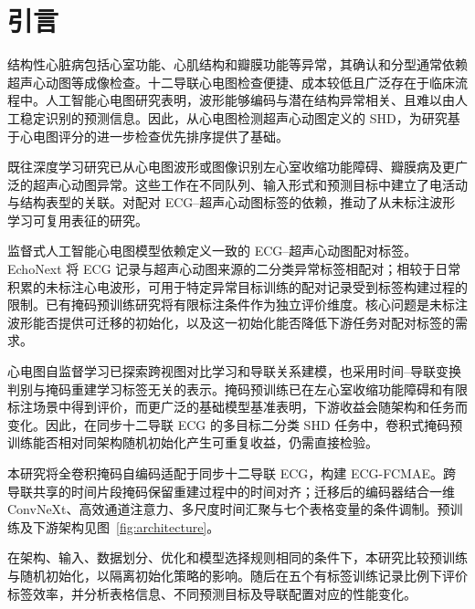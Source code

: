 \section{引言}
\label{sec:introduction}

结构性心脏病包括心室功能、心肌结构和瓣膜功能等异常，其确认和分型通常依赖超声心动图等成像检查\cite{lang2015chamber,otto2021valvular}。十二导联心电图检查便捷、成本较低且广泛存在于临床流程中。人工智能心电图研究表明，波形能够编码与潜在结构异常相关、且难以由人工稳定识别的预测信息\cite{siontis2021aiecg}。因此，从心电图检测超声心动图定义的 SHD，为研究基于心电图评分的进一步检查优先排序提供了基础。

既往深度学习研究已从心电图波形或图像识别左心室收缩功能障碍、瓣膜病及更广泛的超声心动图异常\cite{attia2019contractile,elias2022valvenet,ulloacerna2022rechommend,poterucha2025echonext,dhingra_present_shd_2025,aminorroaya_adapt_shd_2025}。这些工作在不同队列、输入形式和预测目标中建立了电活动与结构表型的关联\cite{avula2023ecgreview}。对配对 ECG--超声心动图标签的依赖，推动了从未标注波形学习可复用表征的研究。

监督式人工智能心电图模型依赖定义一致的 ECG--超声心动图配对标签。EchoNext 将 ECG 记录与超声心动图来源的二分类异常标签相配对\cite{elias2026echonextdata}；相较于日常积累的未标注心电波形，可用于特定异常目标训练的配对记录受到标签构建过程的限制。已有掩码预训练研究将有限标注条件作为独立评价维度\cite{sawano_masked_lvsd_2024,ran_joint_masking_2024}。核心问题是未标注波形能否提供可迁移的初始化，以及这一初始化能否降低下游任务对配对标签的需求。

心电图自监督学习已探索跨视图对比学习和导联关系建模\cite{kiyasseh2021clocs,mehari2022ssl,oh2022leadagnostic}，也采用时间--导联变换判别与掩码重建学习标签无关的表示\cite{zhang_reverse_2023,zhang2023maefe,na2024stmem,ran_joint_masking_2024}。掩码预训练已在左心室收缩功能障碍和有限标注场景中得到评价\cite{sawano_masked_lvsd_2024}，而更广泛的基础模型基准表明，下游收益会随架构和任务而变化\cite{almasud2026benchmark}。因此，在同步十二导联 ECG 的多目标二分类 SHD 任务中，卷积式掩码预训练能否相对同架构随机初始化产生可重复收益，仍需直接检验。

本研究将全卷积掩码自编码适配于同步十二导联 ECG，构建 ECG-FCMAE。跨导联共享的时间片段掩码保留重建过程中的时间对齐；迁移后的编码器结合一维 ConvNeXt、高效通道注意力、多尺度时间汇聚与七个表格变量的条件调制\cite{liu2022convnext,woo2023convnextv2,wang2020ecanet,perez2018film}。预训练及下游架构见图~\ref{fig:architecture}。

在架构、输入、数据划分、优化和模型选择规则相同的条件下，本研究比较预训练与随机初始化，以隔离初始化策略的影响。随后在五个有标签训练记录比例下评价标签效率，并分析表格信息、不同预测目标及导联配置对应的性能变化。

